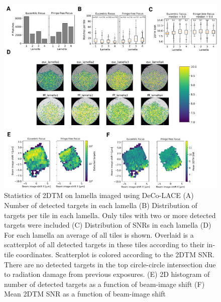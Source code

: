 \documentclass[
]{article}
\begin{document}
\begin{figure}
\hypertarget{fig:matching_stat}{%
\centering
\includegraphics{figures/matching_stat.png}
\caption{Statistics of 2DTM on lamella imaged using DeCo-LACE (A) Number of detected targets in
each lamella (B) Distribution of targets per tile in each lamella. Only tiles
with two or more detected targets were included (C) Distribution of SNRs in each lamella
(D) For each lamella an average of all tiles is shown. Overlaid is a scatterplot
of all detected targets in these tiles according to their in-tile coordinates.
Scatterplot is colored according to the 2DTM SNR. There are no detected targets in the top
circle-circle intersection due to radiation damage from previous exposures. (E) 2D histogram of number of detected targets as a function of beam-image shift (F) Mean 2DTM SNR as a function of beam-image shift}\label{fig:matching_stat}
}
\end{figure}
\end{document}
